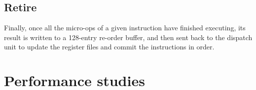 \subsection*{Retire}
\hspace{\parindent}Finally, once all the micro-ops of a given instruction have finished executing, its result is written to a 128-entry re-order buffer, and then sent back to the dispatch unit to update the register files and commit the instructions in order.
\pagebreak{}
\section{Performance studies}

